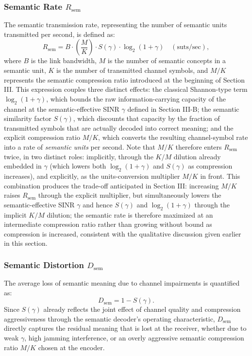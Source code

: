 \documentclass[journal,onecolumn]{IEEEtran}
\begin{document}
\subsubsection{Semantic Rate $R_{\text{sem}}$}
The semantic transmission rate, representing the number of semantic units transmitted per second, is defined as:
\begin{equation}
    R_{\text{sem}} = B \cdot \left( \frac{M}{K} \right) \cdot S(\gamma) \cdot \log_2(1 + \gamma) \quad (\text{suts/sec}),
\end{equation}
where $B$ is the link bandwidth, $M$ is the number of semantic concepts in a semantic unit, $K$ is the number of transmitted channel symbols, and $M/K$ represents the semantic compression ratio introduced at the beginning of Section III. This expression couples three distinct effects: the classical Shannon-type term $\log_2(1+\gamma)$, which bounds the raw information-carrying capacity of the channel at the semantic-effective SINR $\gamma$ defined in Section III-B; the semantic similarity factor $S(\gamma)$, which discounts that capacity by the fraction of transmitted symbols that are actually decoded into correct meaning; and the explicit compression ratio $M/K$, which converts the resulting channel-symbol rate into a rate of \emph{semantic units} per second. Note that $M/K$ therefore enters $R_{\text{sem}}$ twice, in two distinct roles: implicitly, through the $K/M$ dilution already embedded in $\gamma$ (which lowers both $\log_2(1+\gamma)$ and $S(\gamma)$ as compression increases), and explicitly, as the units-conversion multiplier $M/K$ in front. This combination produces the trade-off anticipated in Section III: increasing $M/K$ raises $R_{\text{sem}}$ through the explicit multiplier, but simultaneously lowers the semantic-effective SINR $\gamma$ and hence $S(\gamma)$ and $\log_2(1+\gamma)$ through the implicit $K/M$ dilution; the semantic rate is therefore maximized at an intermediate compression ratio rather than growing without bound as compression is increased, consistent with the qualitative discussion given earlier in this section.

\subsubsection{Semantic Distortion $D_{\text{sem}}$}
The average loss of semantic meaning due to channel impairments is quantified as:
\begin{equation}
    D_{\text{sem}} = 1 - S(\gamma).
\end{equation}
Since $S(\gamma)$ already reflects the joint effect of channel quality and compression aggressiveness through the semantic decoder's operating characteristic, $D_{\text{sem}}$ directly captures the residual meaning that is lost at the receiver, whether due to weak $\gamma$, high jamming interference, or an overly aggressive semantic compression ratio $M/K$ chosen at the encoder.
\end{document}

